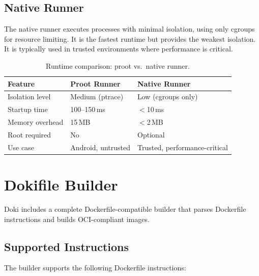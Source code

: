 \subsection{Native Runner}
\label{sec:native-runner}

The native runner executes processes with minimal isolation, using only
cgroups for resource limiting. It is the fastest runtime but provides
the weakest isolation. It is typically used in trusted environments
where performance is critical.

\begin{table}[htbp]
  \centering
  \caption{Runtime comparison: proot vs.\ native runner.}
  \label{tab:runtime-comparison}
  \begin{tabularx}{\textwidth}{l X X}
    \toprule
    \textbf{Feature} & \textbf{Proot Runner} & \textbf{Native Runner} \\
    \midrule
    Isolation level  & Medium (ptrace) & Low (cgroups only) \\
    Startup time     & 100--150\,ms    & $<$10\,ms \\
    Memory overhead  & 15\,MB          & $<$2\,MB \\
    Root required    & No              & Optional \\
    Use case         & Android, untrusted & Trusted, performance-critical \\
    \bottomrule
  \end{tabularx}
\end{table}

\section{Dokifile Builder}
\label{sec:builder}

Doki includes a complete Dockerfile-compatible builder that parses
Dockerfile instructions and builds OCI-compliant images.

\subsection{Supported Instructions}
\label{sec:supported-instructions}

The builder supports the following Dockerfile instructions:

